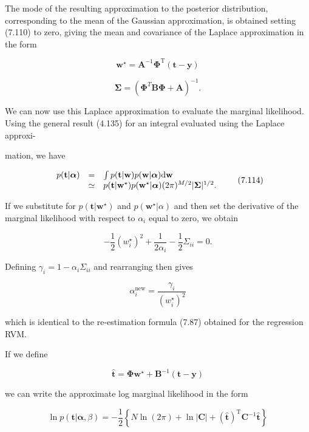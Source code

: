 \documentclass[
  10
]{article}
\begin{document}
The mode of the resulting approximation to the posterior distribution,
corresponding to the mean of the Gaussian approximation, is obtained
setting (7.110) to zero, giving the mean and covariance of the Laplace
approximation in the form

\[
\mathbf {w} ^ {\star} = \mathbf {A} ^ {- 1} \boldsymbol {\Phi} ^ {\mathrm{T}} (\mathbf {t} - \mathbf {y})\tag{7.112}
\]

\[
\boldsymbol {\Sigma} = \left(\boldsymbol {\Phi} ^ {T} \mathbf {B} \boldsymbol {\Phi} + \mathbf {A}\right) ^ {- 1}.\tag{7.113}
\]

We can now use this Laplace approximation to evaluate the marginal
likelihood. Using the general result (4.135) for an integral evaluated
using the Laplace approxi-

mation, we have

\[
\begin{array}{r c l} p (\mathbf {t} | \boldsymbol {\alpha}) & = & \int p (\mathbf {t} | \mathbf {w}) p (\mathbf {w} | \boldsymbol {\alpha})   \mathrm{d} \mathbf {w} \\ & \simeq & p (\mathbf {t} | \mathbf {w} ^ {\star}) p (\mathbf {w} ^ {\star} | \boldsymbol {\alpha}) (2 \pi) ^ {M / 2} | \boldsymbol {\Sigma} | ^ {1 / 2}. \end{array}\tag{7.114}
\]

If we substitute for \(p ( \mathbf { t } | \mathbf { w } ^ { \star } )\)
and \(p ( \mathbf { w } ^ { \star } | \alpha )\) and then set the
derivative of the marginal likelihood with respect to \(\alpha _ { i }\)
equal to zero, we obtain

\[
- \frac {1}{2} (w _ {i} ^ {\star}) ^ {2} + \frac {1}{2 \alpha_ {i}} - \frac {1}{2} \Sigma_ {i i} = 0.\tag{7.115}
\]

Defining \(\gamma _ { i } = 1 - \alpha _ { i } \Sigma _ { i i }\) and
rearranging then gives

\[
\alpha_ {i} ^ {\mathrm{new}} = \frac {\gamma_ {i}}{(w _ {i} ^ {\star}) ^ {2}}\tag{7.116}
\]

which is identical to the re-estimation formula (7.87) obtained for the
regression RVM.

If we define

\[
\widehat {\mathbf {t}} = \boldsymbol {\Phi} \mathbf {w} ^ {\star} + \mathbf {B} ^ {- 1} (\mathbf {t} - \mathbf {y})\tag{7.117}
\]

we can write the approximate log marginal likelihood in the form

\[
\ln p (\mathbf {t} | \boldsymbol {\alpha}, \beta) = - \frac {1}{2} \left\{N \ln (2 \pi) + \ln | \mathbf {C} | + (\widehat {\mathbf {t}}) ^ {\mathrm{T}} \mathbf {C} ^ {- 1} \widehat {\mathbf {t}} \right\}\tag{7.118}
\]
\end{document}
